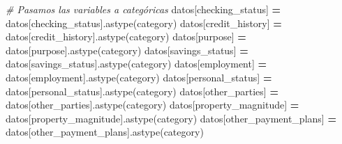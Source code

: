 \documentclass[
  a4paper,
  DIV=11,
  numbers=noendperiod]{scrreprt}
\newenvironment{Shaded}{\begin{snugshade}}{\end{snugshade}}
\newcommand{\CommentTok}[1]{\textcolor[rgb]{0.56,0.35,0.01}{\textit{#1}}}
\newcommand{\NormalTok}[1]{#1}
\newcommand{\OperatorTok}[1]{\textcolor[rgb]{0.81,0.36,0.00}{\textbf{#1}}}
\newcommand{\StringTok}[1]{\textcolor[rgb]{0.31,0.60,0.02}{#1}}
\begin{document}
\begin{Shaded}
\begin{Highlighting}[numbers=left,,]
\CommentTok{\# Pasamos las variables a categóricas}
\NormalTok{datos[}\StringTok{\textquotesingle{}checking\_status\textquotesingle{}}\NormalTok{] }\OperatorTok{=}\NormalTok{ datos[}\StringTok{\textquotesingle{}checking\_status\textquotesingle{}}\NormalTok{].astype(}\StringTok{\textquotesingle{}category\textquotesingle{}}\NormalTok{)}
\NormalTok{datos[}\StringTok{\textquotesingle{}credit\_history\textquotesingle{}}\NormalTok{] }\OperatorTok{=}\NormalTok{ datos[}\StringTok{\textquotesingle{}credit\_history\textquotesingle{}}\NormalTok{].astype(}\StringTok{\textquotesingle{}category\textquotesingle{}}\NormalTok{)}
\NormalTok{datos[}\StringTok{\textquotesingle{}purpose\textquotesingle{}}\NormalTok{] }\OperatorTok{=}\NormalTok{ datos[}\StringTok{\textquotesingle{}purpose\textquotesingle{}}\NormalTok{].astype(}\StringTok{\textquotesingle{}category\textquotesingle{}}\NormalTok{)}
\NormalTok{datos[}\StringTok{\textquotesingle{}savings\_status\textquotesingle{}}\NormalTok{] }\OperatorTok{=}\NormalTok{ datos[}\StringTok{\textquotesingle{}savings\_status\textquotesingle{}}\NormalTok{].astype(}\StringTok{\textquotesingle{}category\textquotesingle{}}\NormalTok{)}
\NormalTok{datos[}\StringTok{\textquotesingle{}employment\textquotesingle{}}\NormalTok{] }\OperatorTok{=}\NormalTok{ datos[}\StringTok{\textquotesingle{}employment\textquotesingle{}}\NormalTok{].astype(}\StringTok{\textquotesingle{}category\textquotesingle{}}\NormalTok{)}
\NormalTok{datos[}\StringTok{\textquotesingle{}personal\_status\textquotesingle{}}\NormalTok{] }\OperatorTok{=}\NormalTok{ datos[}\StringTok{\textquotesingle{}personal\_status\textquotesingle{}}\NormalTok{].astype(}\StringTok{\textquotesingle{}category\textquotesingle{}}\NormalTok{)}
\NormalTok{datos[}\StringTok{\textquotesingle{}other\_parties\textquotesingle{}}\NormalTok{] }\OperatorTok{=}\NormalTok{ datos[}\StringTok{\textquotesingle{}other\_parties\textquotesingle{}}\NormalTok{].astype(}\StringTok{\textquotesingle{}category\textquotesingle{}}\NormalTok{)}
\NormalTok{datos[}\StringTok{\textquotesingle{}property\_magnitude\textquotesingle{}}\NormalTok{] }\OperatorTok{=}\NormalTok{ datos[}\StringTok{\textquotesingle{}property\_magnitude\textquotesingle{}}\NormalTok{].astype(}\StringTok{\textquotesingle{}category\textquotesingle{}}\NormalTok{)}
\NormalTok{datos[}\StringTok{\textquotesingle{}other\_payment\_plans\textquotesingle{}}\NormalTok{] }\OperatorTok{=}\NormalTok{ datos[}\StringTok{\textquotesingle{}other\_payment\_plans\textquotesingle{}}\NormalTok{].astype(}\StringTok{\textquotesingle{}category\textquotesingle{}}\NormalTok{)}

\end{Highlighting}
\end{Shaded}
\end{document}
